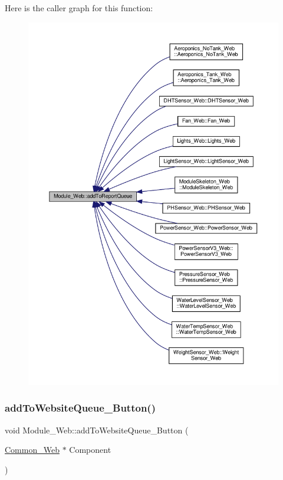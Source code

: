 Here is the caller graph for this function\+:
\nopagebreak
\begin{figure}[H]
\begin{center}
\leavevmode
\includegraphics[width=350pt]{class_module___web_a9b1a806569076aa701e961d54f888447_icgraph}
\end{center}
\end{figure}
\mbox{\label{class_module___web_adadb1643a6b460c0d53a7341bb356ee1}} 
\subsubsection{\texorpdfstring{add\+To\+Website\+Queue\+\_\+\+Button()}{addToWebsiteQueue\_Button()}\hspace{0.1cm}{\footnotesize\ttfamily [1/2]}}
{\footnotesize\ttfamily void Module\+\_\+\+Web\+::add\+To\+Website\+Queue\+\_\+\+Button (\begin{DoxyParamCaption}\item[{\hyperlink{class_common___web}{Common\+\_\+\+Web} $\ast$}]{Component }\end{DoxyParamCaption})}




